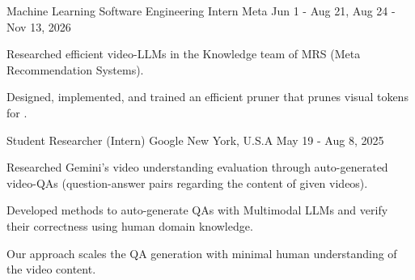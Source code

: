 

\begin{cventries}

  \cvwork
    {Machine Learning Software Engineering Intern} %
    {Meta} %
    {} %
    {Jun 1 - Aug 21, Aug 24 - Nov 13, 2026} %
    {
      \begin{cvitems} %
        \item{Researched efficient video-LLMs in the Knowledge team of MRS (Meta Recommendation Systems).}
        \item{Designed, implemented, and trained an efficient pruner that prunes visual tokens for \underline{}.}
      \end{cvitems}
    }

  \cvwork
    {Student Researcher (Intern)} %
    {Google} %
    {New York, U.S.A} %
    {May 19 - Aug 8, 2025} %
    {
      \begin{cvitems} %
        \item{Researched Gemini's video understanding evaluation through auto-generated video-QAs (question-answer pairs regarding the content of given videos).}
        \item{Developed methods to auto-generate QAs with Multimodal LLMs and verify their correctness using human domain knowledge.}
        \item{Our approach scales the QA generation with minimal human understanding of the video content.}
      \end{cvitems}
    }


\end{cventries}
